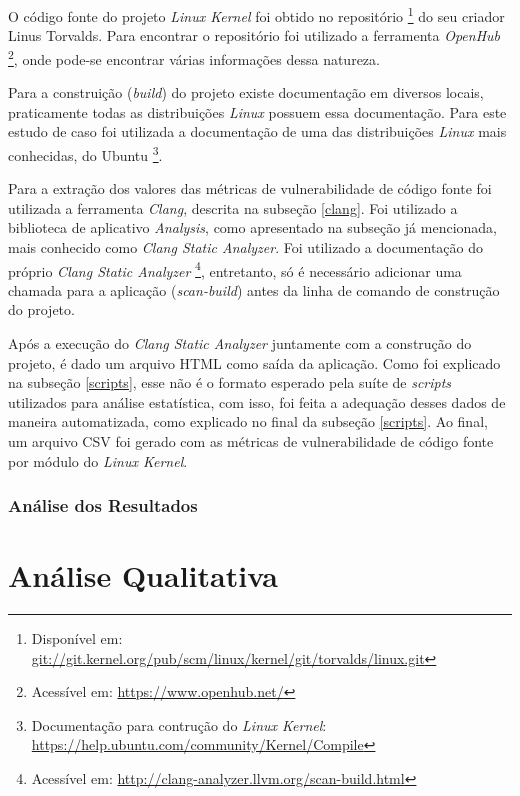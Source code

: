 O código fonte do projeto \emph{Linux Kernel} foi obtido no repositório \footnote{Disponível em:
\url{git://git.kernel.org/pub/scm/linux/kernel/git/torvalds/linux.git}} do seu
criador Linus Torvalds. Para encontrar o repositório foi utilizado a ferramenta
\emph{OpenHub} \footnote{Acessível em: \url{https://www.openhub.net/}}, onde
pode-se encontrar várias informações dessa natureza.

Para a construição (\textit{build}) do projeto existe documentação em diversos
locais, praticamente todas as distribuições \emph{Linux} possuem essa
documentação. Para este estudo de caso foi utilizada a documentação de uma das
distribuições \emph{Linux} mais conhecidas, do Ubuntu \footnote{Documentação para
  contrução do \emph{Linux Kernel}:
\url{https://help.ubuntu.com/community/Kernel/Compile}}.

Para a extração dos valores das métricas de vulnerabilidade de código fonte foi
utilizada a ferramenta \emph{Clang}, descrita na subseção
\ref{clang}. Foi utilizado a biblioteca de aplicativo
\textit{Analysis}, como apresentado na subseção já mencionada, mais conhecido como \emph{Clang Static
Analyzer}. Foi utilizado a documentação do próprio \emph{Clang Static Analyzer}
\footnote{Acessível em: \url{http://clang-analyzer.llvm.org/scan-build.html}},
entretanto, só é necessário adicionar uma chamada para a aplicação
(\textit{scan-build}) antes da linha de comando de construção do projeto.

Após a execução do \emph{Clang Static Analyzer} juntamente com a construção do
projeto, é dado um arquivo HTML como saída da aplicação. Como foi explicado na
subseção \ref{scripts}, esse não é o formato esperado pela suíte de
\textit{scripts} utilizados para análise estatística, com isso, foi feita a
adequação desses dados de maneira automatizada, como explicado no final da
subseção \ref{scripts}. Ao final, um arquivo CSV foi gerado com as métricas de
vulnerabilidade de código fonte por módulo do \emph{Linux Kernel}.

\subsubsection{Análise dos Resultados}

\section{Análise Qualitativa}

